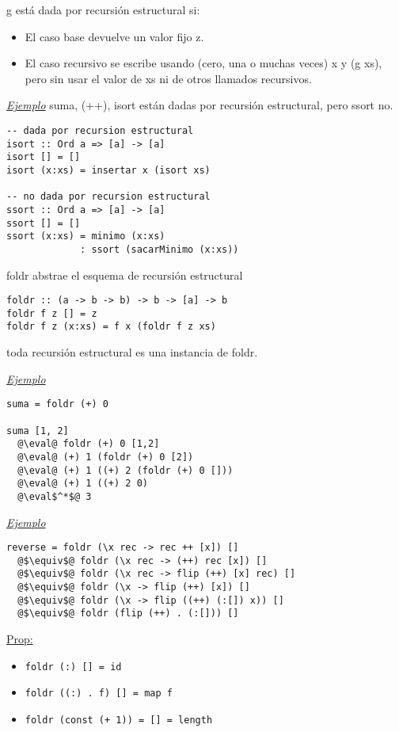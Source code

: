 \documentclass[12pt]{extarticle}
\def\propiedad{\underline{Prop:} }
\def\ejemplo{\textit{\underline{Ejemplo} }}
\def\eval{$\rightsquigarrow$}
\newcommand\hsline[1]{\texttt{#1}}
\begin{document}
g está dada por recursión estructural si:
\begin{itemize}
\vspace{-0.2cm}
\setlength\itemsep{-0.4em}
  \item El caso base devuelve un valor fijo z.
  \item El caso recursivo se escribe usando (cero, una o muchas veces) x y (g xs), pero sin usar el valor de xs ni de otros llamados recursivos.
\end{itemize}

\ejemplo suma, (++), isort están dadas por recursión estructural, pero ssort no.
\begin{verbatim}
-- dada por recursion estructural
isort :: Ord a => [a] -> [a]
isort [] = []
isort (x:xs) = insertar x (isort xs)

-- no dada por recursion estructural
ssort :: Ord a => [a] -> [a]
ssort [] = []
ssort (x:xs) = minimo (x:xs)
             : ssort (sacarMinimo (x:xs))
\end{verbatim}

foldr abstrae el esquema de recursión estructural
\begin{verbatim}
foldr :: (a -> b -> b) -> b -> [a] -> b
foldr f z [] = z
foldr f z (x:xs) = f x (foldr f z xs)
\end{verbatim}
toda recursión estructural es una instancia de foldr.

\ejemplo
\begin{verbatim}
suma = foldr (+) 0

suma [1, 2]
  @\eval@ foldr (+) 0 [1,2]
  @\eval@ (+) 1 (foldr (+) 0 [2])
  @\eval@ (+) 1 ((+) 2 (foldr (+) 0 []))
  @\eval@ (+) 1 ((+) 2 0)
  @\eval$^*$@ 3
\end{verbatim}

\ejemplo
\begin{verbatim}
reverse = foldr (\x rec -> rec ++ [x]) []
  @$\equiv$@ foldr (\x rec -> (++) rec [x]) []
  @$\equiv$@ foldr (\x rec -> flip (++) [x] rec) []
  @$\equiv$@ foldr (\x -> flip (++) [x]) []
  @$\equiv$@ foldr (\x -> flip ((++) (:[]) x)) []
  @$\equiv$@ foldr (flip (++) . (:[])) []
\end{verbatim}

\propiedad 
\begin{itemize}
\vspace{-0.2cm}
\setlength\itemsep{-0.4em}
\item \hsline{foldr (:) [] = id}
\item \hsline{foldr ((:) . f) [] = map f}
\item \hsline{foldr (const (+ 1)) = [] = length}
\end{itemize}
\end{document}

